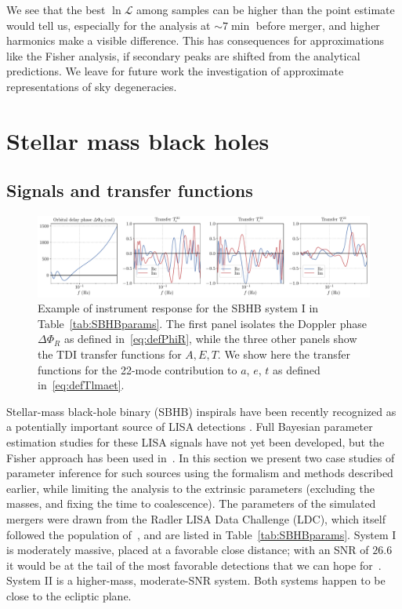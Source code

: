 \documentclass[aps,showpacs,twocolumn,prd,superscriptaddress,nofootinbib]{revtex4-1}
\newcommand\calL{{\mathcal{L}}}
\begin{document}
We see that the best $\ln \calL$ among samples can be higher than the point estimate would tell us, especially for the analysis at $\sim 7 \min$ before merger, and higher harmonics make a visible difference. This has consequences for approximations like the Fisher analysis, if secondary peaks are shifted from the analytical predictions. We leave for future work the investigation of approximate representations of sky degeneracies.


\section{Stellar mass black holes}
\label{sec:SBHB}


\subsection{Signals and transfer functions}
\label{subsec:signaltransferSBHB}

\begin{figure}
  \centering
  \includegraphics[width=.98\linewidth]{plot_sobh1_tdi.pdf}
  \caption{Example of instrument response for the SBHB system I in Table~\ref{tab:SBHBparams}. The first panel isolates the Doppler phase $\Delta\Phi_{R}$ as defined in~\eqref{eq:defPhiR}, while the three other panels show the TDI transfer functions for $A,E,T$. We show here the transfer functions for the 22-mode contribution to $a$, $e$, $t$ as defined in~\eqref{eq:defTlmaet}.}
  \label{fig:transferSBHBcaseI}
\end{figure}

Stellar-mass black-hole binary (SBHB) inspirals have been recently recognized as a potentially
important source of LISA detections \cite{Sesana16, Vitale16}. Full Bayesian parameter
estimation studies for these LISA signals have not yet been developed, but the Fisher approach has been used in~\cite{Sesana16, Vitale16, Nishizawa+16a, Nishizawa+16b}. In this section we present two case
studies of parameter inference for such sources using the formalism and methods
described earlier, while limiting the analysis to the extrinsic parameters (excluding the masses, and fixing the time to coalescence). The parameters of the simulated mergers were drawn from the Radler LISA Data Challenge (LDC), which itself followed the population of~\cite{Sesana16}, and are listed in Table~\ref{tab:SBHBparams}.
System I is moderately massive, placed at a favorable close distance; with an SNR of $26.6$ it would be at the tail of the most favorable detections that we can hope for~\cite{Sesana16, Gerosa+19, Moore+19}.
System II is a higher-mass, moderate-SNR system.
Both systems happen to be close to the ecliptic plane.
\end{document}
